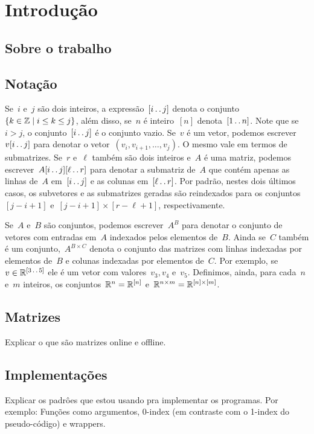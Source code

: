 \section{Introdução}
\label{Introducao}

\subsection{Sobre o trabalho}

\subsection{Notação}
Se~$i$ e~$j$ são dois inteiros, a expressão~$[i \,.\,.\, j]$ denota o conjunto~${ \{ k \in \mathbb{Z} \mid i \leq k \leq j \} }$, além disso, se~$n$ é inteiro~$[n]$ denota~$[1 \,.\,.\, n]$. Note que se~$i > j$, o conjunto~$[i \,.\,.\, j]$ é o conjunto vazio. Se~$v$ é um vetor, podemos escrever~$v[i \,.\,.\, j]$ para denotar o vetor~${ (v_i, v_{i+1}, \dots, v_j) }$. O mesmo vale em termos de submatrizes. Se~$r$ e~$\ell$ também são dois inteiros e~$A$ é uma matriz, podemos escrever~$A[i \,.\,.\, j][\ell \,.\,.\, r]$ para denotar a submatriz de~$A$ que contém apenas as linhas de~$A$ em~$[i \,.\,.\, j]$ e as colunas em~$[\ell \,.\,.\, r]$. Por padrão, nestes dois últimos casos, os subvetores e as submatrizes geradas são reindexados para os conjuntos~$[j - i + 1]$ e~${ [j - i + 1] \times [r - \ell + 1] }$, respectivamente.

Se~$A$ e~$B$ são conjuntos, podemos escrever~$A^B$ para denotar o conjunto de vetores com entradas em~$A$ indexados pelos elementos de~$B$. Ainda se~$C$ também é um conjunto,~$A^{B \times C}$ denota o conjunto das matrizes com linhas indexadas por elementos de~$B$ e colunas indexadas por elementos de~$C$. Por exemplo, se~$v \in \mathbb{R}^{ [3 \,.\,.\, 5] }$ ele é um vetor com valores~${ v_3, v_4 }$ e~$v_5$. Definimos, ainda, para cada~$n$ e~$m$ inteiros, os conjuntos~${ \mathbb{R}^n = \mathbb{R}^{ [n] } }$ e~${ \mathbb{R}^{n \times m} = \mathbb{R}^{[n] \times [m]} }$.

\subsection{Matrizes}
Explicar o que são matrizes online e offline.

\subsection{Implementações} \label{Intro:impl}
Explicar os padrôes que estou usando pra implementar os programas. Por exemplo: Funções como argumentos, 0-index (em contraste com o 1-index do pseudo-código) e wrappers.
